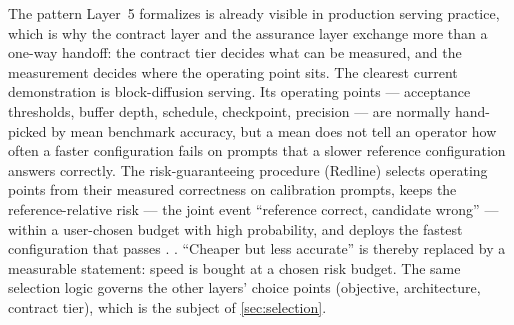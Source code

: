 The pattern Layer~5 formalizes is already visible in production serving practice, which is
why the contract layer and the assurance layer exchange more than a one-way handoff: the
contract tier decides what can be measured, and the measurement decides where the operating
point sits. The clearest current demonstration is block-diffusion serving. Its operating points --- acceptance
thresholds, buffer depth, schedule, checkpoint, precision --- are normally hand-picked by mean
benchmark accuracy, but a mean does not tell an operator how often a faster configuration fails
on prompts that a slower reference configuration answers correctly. The risk-guaranteeing
procedure (Redline) selects operating points from their measured correctness on calibration
prompts, keeps the reference-relative risk --- the joint event ``reference correct, candidate
wrong'' --- within a user-chosen budget with high probability, and deploys the fastest
configuration that passes \cite{id260933887}. 
 \cite{id260933887}. ``Cheaper but less
accurate'' is thereby replaced by a measurable statement: speed is bought at a chosen risk
budget. The same selection logic governs the other layers' choice points
(objective, architecture, contract tier), which is the subject of \cref{sec:selection}.

